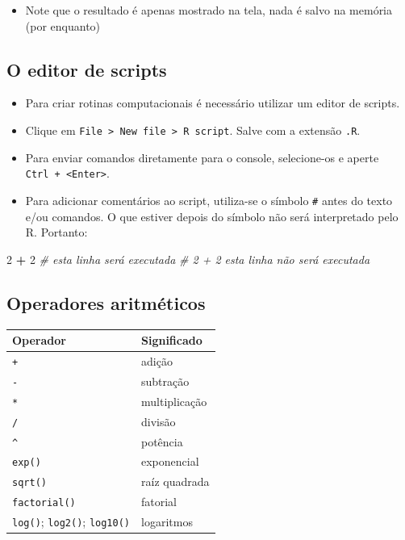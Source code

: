 \documentclass[10pt,a4paper]{book}
\newenvironment{Shaded}{\begin{snugshade}}{\end{snugshade}}
\newcommand{\DecValTok}[1]{\textcolor[rgb]{0.00,0.00,0.81}{#1}}
\newcommand{\StringTok}[1]{\textcolor[rgb]{0.31,0.60,0.02}{#1}}
\newcommand{\CommentTok}[1]{\textcolor[rgb]{0.56,0.35,0.01}{\textit{#1}}}
\newcommand{\OperatorTok}[1]{\textcolor[rgb]{0.81,0.36,0.00}{\textbf{#1}}}
\providecommand{\tightlist}{%
  \setlength{\itemsep}{0pt}\setlength{\parskip}{0pt}}
\begin{document}
\begin{itemize}
\tightlist
\item
  Note que o resultado é apenas mostrado na tela, nada é salvo na
  memória (por enquanto)
\end{itemize}

\subsection{O editor de scripts}\label{o-editor-de-scripts}

\begin{itemize}
\tightlist
\item
  Para criar rotinas computacionais é necessário utilizar um editor de
  scripts.
\item
  Clique em
  \texttt{File\ \textgreater{}\ New\ file\ \textgreater{}\ R\ script}.
  Salve com a extensão \texttt{.R}.
\item
  Para enviar comandos diretamente para o console, selecione-os e aperte
  \texttt{Ctrl\ +\ \textless{}Enter\textgreater{}}.
\item
  Para adicionar comentários ao script, utiliza-se o símbolo \texttt{\#}
  antes do texto e/ou comandos. O que estiver depois do símbolo não será
  interpretado pelo R. Portanto:
\end{itemize}

\begin{Shaded}
\begin{Highlighting}[]
\DecValTok{2} \OperatorTok{+}\StringTok{ }\DecValTok{2}     \CommentTok{# esta linha será executada}
\CommentTok{# 2 + 2     esta linha não será executada}
\end{Highlighting}
\end{Shaded}

\subsection{Operadores aritméticos}\label{operadores-aritmeticos}

\begin{longtable}[]{@{}ll@{}}
\toprule
Operador & Significado\tabularnewline
\midrule
\endhead
\texttt{+} & adição\tabularnewline
\texttt{-} & subtração\tabularnewline
\texttt{*} & multiplicação\tabularnewline
\texttt{/} & divisão\tabularnewline
\texttt{\^{}} & potência\tabularnewline
\texttt{exp()} & exponencial\tabularnewline
\texttt{sqrt()} & raíz quadrada\tabularnewline
\texttt{factorial()} & fatorial\tabularnewline
\texttt{log()}; \texttt{log2()}; \texttt{log10()} &
logaritmos\tabularnewline
\bottomrule
\end{longtable}
\end{document}
